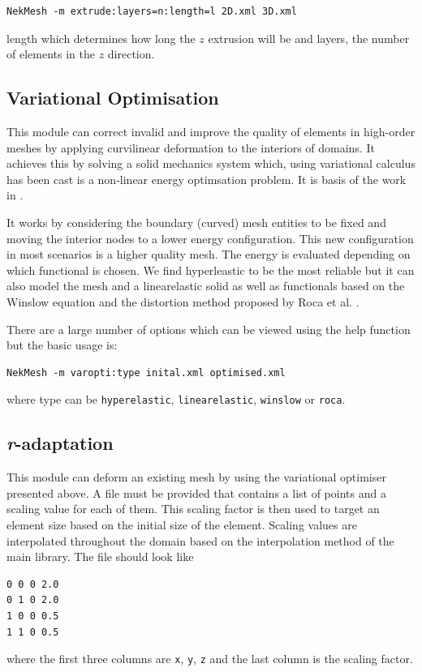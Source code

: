 \begin{lstlisting}[style=BashInputStyle]
  NekMesh -m extrude:layers=n:length=l 2D.xml 3D.xml
\end{lstlisting}

length which determines how long the $z$ extrusion will be and layers, the
number of elements in the $z$ direction.

\subsection{Variational Optimisation}
\label{sec:varopti}
This module can correct invalid and improve the quality of elements in
high-order meshes by applying curvilinear deformation to the interiors of
domains. It achieves this by solving a solid mechanics system which, using
variational calculus has been cast is a non-linear energy optimsation problem.
It is basis of the work in \cite{TuPeMo16}.

It works by considering the boundary (curved) mesh entities to be fixed and
moving the interior nodes to a lower  energy configuration. This new
configuration in most scenarios is a higher quality mesh. The energy is
evaluated depending on which functional is chosen. We find hyperleastic to be
the most reliable but it can also model the mesh and a linearelastic solid as
well as functionals based on the Winslow equation and the distortion method
proposed by Roca et al. \cite{GaRoPeSa15}.

There are a large number of options which can be viewed using the help function
but the basic usage is:
\begin{lstlisting}[style=BashInputStyle]
  NekMesh -m varopti:type inital.xml optimised.xml
\end{lstlisting}

where type can be \texttt{hyperelastic}, \texttt{linearelastic},
\texttt{winslow} or \texttt{roca}.

\subsection{\emph{r}-adaptation}

This module can deform an existing mesh by using the variational optimiser
presented above. A file must be provided that contains a list of points
and a scaling value for each of them. This scaling factor is then used to
target an element size based on the initial size of the element. Scaling
values are interpolated throughout the domain based on the interpolation
method of the main library. The file should look like
\begin{lstlisting}
0 0 0 2.0
0 1 0 2.0
1 0 0 0.5
1 1 0 0.5
\end{lstlisting}
where the first three columns are \texttt{x}, \texttt{y}, \texttt{z} and
the last column is the scaling factor.

